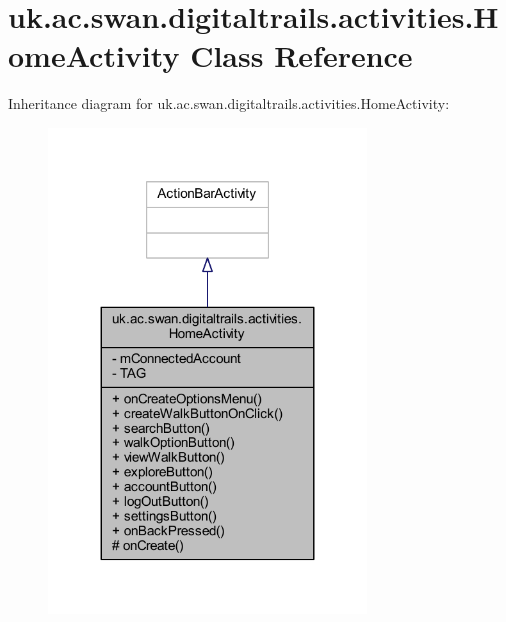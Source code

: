 \hypertarget{classuk_1_1ac_1_1swan_1_1digitaltrails_1_1activities_1_1_home_activity}{\section{uk.\+ac.\+swan.\+digitaltrails.\+activities.\+Home\+Activity Class Reference}
\label{classuk_1_1ac_1_1swan_1_1digitaltrails_1_1activities_1_1_home_activity}
}


Inheritance diagram for uk.\+ac.\+swan.\+digitaltrails.\+activities.\+Home\+Activity\+:
\nopagebreak
\begin{figure}[H]
\begin{center}
\leavevmode
\includegraphics[width=239pt]{classuk_1_1ac_1_1swan_1_1digitaltrails_1_1activities_1_1_home_activity__inherit__graph}
\end{center}
\end{figure}


